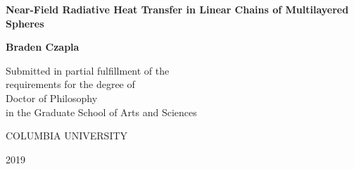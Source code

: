 
\thispagestyle{empty} %
\begin{center}

\vspace*{1in}

{\huge\textbf{Near-Field Radiative Heat Transfer in Linear Chains of Multilayered Spheres}}

\SingleSpace

\bigskip
\bigskip %

{\Large\textbf{Braden Czapla}}

  \vfill

  Submitted in partial fulfillment of the\\
  requirements for the degree of\\
  Doctor of Philosophy\\
  in the Graduate School of Arts and Sciences

  \bigskip
  \bigskip

  COLUMBIA UNIVERSITY

  \bigskip %

  2019
\end{center}
